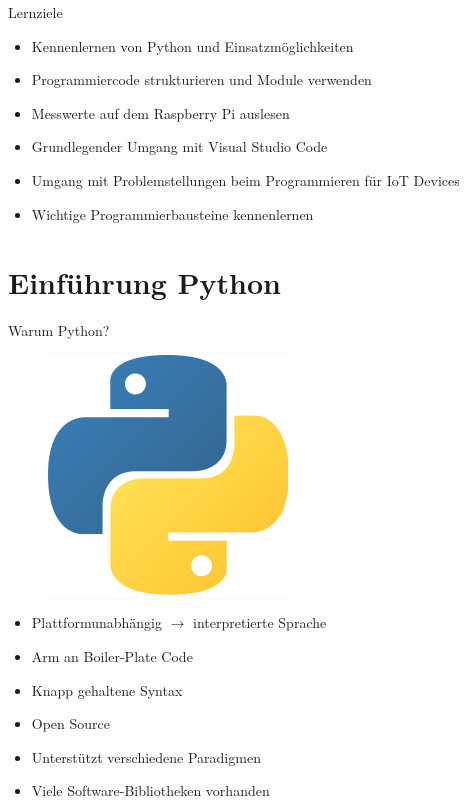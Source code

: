 

\begin{frame}{Lernziele}
    \begin{itemize}
        \item Kennenlernen von Python und  Einsatzmöglichkeiten
        \item Programmiercode strukturieren und Module verwenden
        \item Messwerte auf dem Raspberry Pi auslesen
        \item Grundlegender Umgang mit Visual Studio Code
        \item Umgang mit Problemstellungen beim Programmieren für IoT Devices
        \item Wichtige Programmierbausteine kennenlernen
    \end{itemize}
\end{frame}

\section{Einführung Python}



\begin{frame}{Warum Python?}
    \begin{figure}[!htb]
        \includegraphics[scale=0.25]{4-programmierung/img/240px-Python-logo-notext}
    \end{figure}
    \begin{itemize}
        \item Plattformunabhängig  $\rightarrow$ interpretierte Sprache
        \item Arm an Boiler-Plate Code
        \item Knapp gehaltene Syntax
        \item Open Source
        \item Unterstützt verschiedene Paradigmen
        \item Viele Software-Bibliotheken vorhanden
    \end{itemize}
\end{frame}


